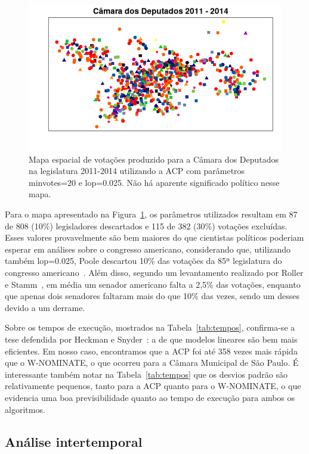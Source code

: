 \documentclass[a4paper, 12pt]{article}
\newcommand\wnominate{W-NOMINATE\xspace}
\begin{document}
\begin{figure}[h!]
  \centering
  \includegraphics[scale=0.7]{figs/mapa-ruim.png}
  \caption{Mapa espacial de votações produzido para a Câmara dos Deputados na legislatura 2011-2014 utilizando a ACP com parâmetros \textsf{minvotes=20} e \textsf{lop=0.025}. Não há aparente significado político nesse mapa.}
  \label{fig:mapa-ruim}
\end{figure}

Para o mapa apresentado na Figura~\ref{fig:mapa-ruim}, os parâmetros utilizados resultam em 87 de 808 (10\%) legisladores descartados e 115 de 382 (30\%) votações excluídas. Esses valores provavelmente são bem maiores do que cientistas políticos poderiam esperar em análises sobre o congresso americano, considerando que, utilizando também \textsf{lop=0.025}, Poole descartou 10\% das votações da 85ª legislatura do congresso americano~\cite{poole1985nominate}. Além disso, segundo um levantamento realizado por Roller e Stamm~\cite{roller2014attendance}, em média um senador americano falta a 2,5\% das votações, enquanto que apenas dois senadores faltaram mais do que 10\% das vezes, sendo um desses devido a um derrame. 

Sobre os tempos de execução, mostrados na Tabela~\ref{tab:tempos}, confirma-se a tese defendida por Heckman e Snyder~\cite{heckman-snyder1997}: a de que modelos lineares são bem mais eficientes. Em nosso caso, encontramos que a ACP foi até 358 vezes mais rápida que o \wnominate, o que ocorreu para a Câmara Municipal de São Paulo. É interessante também notar na Tabela~\ref{tab:tempos} que os desvios padrão são relativamente pequenos, tanto para a ACP quanto para o \wnominate, o que evidencia uma boa previsibilidade quanto ao tempo de execução para ambos os algoritmos.

\subsection{Análise intertemporal}
\end{document}
